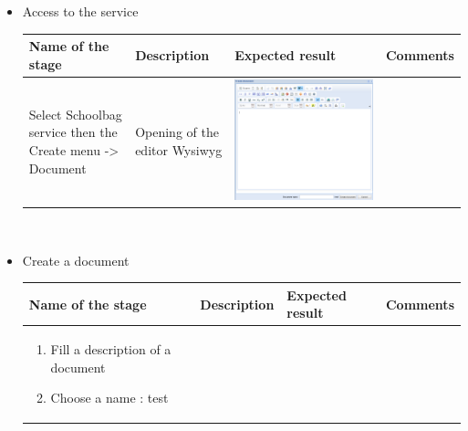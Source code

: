 \newpage
\begin{itemize}
	\item Access to the service\\

\begin{tabular}{|m{4cm}|m{3cm}|m{4cm}|m{2.1cm}|}
\hline
\textbf{Name of the stage} & \textbf{Description}
 & \textbf{Expected result} & \textbf{Comments} \\
\hline
Select Schoolbag service then the Create menu -> Document & 
Opening of the editor Wysiwyg & 
\begin{minipage}{0.7\textwidth}
\includegraphics[scale=0.15]{Images/wysi.png} 
\end{minipage}& 
\\
\hline
\end{tabular}
\\
	\item Create a document \\

\begin{tabular}{|m{4cm}|m{3cm}|m{4cm}|m{2.1cm}|}
\hline
\textbf{Name of the stage} & \textbf{Description}
 & \textbf{Expected result} & \textbf{Comments} \\
\hline
\begin{enumerate}
	\item Fill a description of a document

	\item Choose a name : test


\end{enumerate}
\end{tabular}
\end{itemize}
